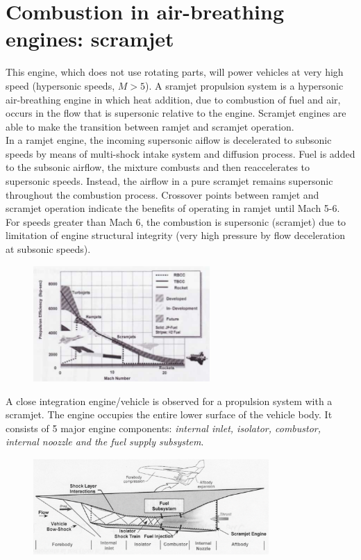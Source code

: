 \documentclass[12pt]{article}
\begin{document}
\newpage

\section{Combustion in air-breathing engines: scramjet}

This engine, which does not use rotating parts, will power vehicles at very high speed (hypersonic speeds, $M>5$). A sramjet propulsion system is a hypersonic air-breathing engine in which heat addition, due to combustion of fuel and air, occurs in the flow that is supersonic relative to the engine. Scramjet engines are able to make the transition between ramjet and scramjet operation.\\
In a ramjet engine, the incoming supersonic aiflow is decelerated to subsonic speeds by means of multi-shock intake system and diffusion process. Fuel is added to the subsonic airflow, the mixture combusts and then reaccelerates to supersonic speeds. Instead, the airflow in a pure scramjet remains supersonic throughout the combustion process. Crossover points between ramjet and scramjet operation indicate the benefits of operating in ramjet until Mach 5-6. For speeds greater than Mach 6, the combustion is supersonic (scramjet) due to limitation of engine structural integrity (very high pressure by flow deceleration at subsonic speeds).

\begin{figure}[h!]
\centering
\includegraphics[width=0.6\textwidth]{figures/ramjetcomp.png}
\end{figure}

A close integration engine/vehicle is observed for a propulsion system with a scramjet. The engine occupies the entire lower surface of the vehicle body. It consists of 5 major engine components: \textit{internal inlet, isolator, combustor, internal noozzle and the fuel supply subsystem}.

\begin{figure}[h!]
\centering
\includegraphics[width=0.8\textwidth]{figures/scramjetengine.png}
\end{figure}
\end{document}
